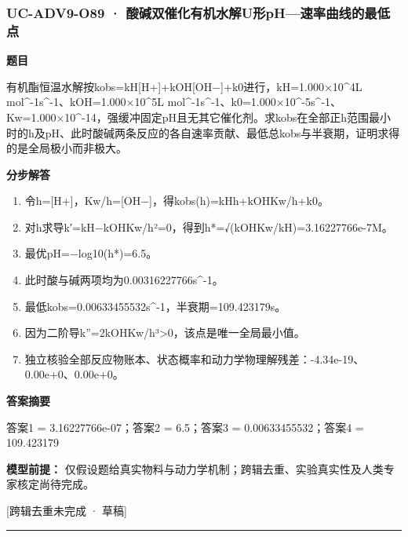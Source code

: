 \documentclass[UTF8,11pt,a4paper]{ctexart}
\begin{document}
\subsubsection*{UC-ADV9-O89 · 酸碱双催化有机水解U形pH—速率曲线的最低点}
\noindent\textbf{题目}\par
有机酯恒温水解按kobs=kH[H+]+kOH[OH−]+k0进行，kH=1.000×10\textasciicircum{}4L mol\textasciicircum{}-1s\textasciicircum{}-1、kOH=1.000×10\textasciicircum{}5L mol\textasciicircum{}-1s\textasciicircum{}-1、k0=1.000×10\textasciicircum{}-5s\textasciicircum{}-1、Kw=1.000×10\textasciicircum{}-14，强缓冲固定pH且无其它催化剂。求kobs在全部正h范围最小时的h及pH、此时酸碱两条反应的各自速率贡献、最低总kobs与半衰期，证明求得的是全局极小而非极大。\par
\medskip\noindent\textbf{分步解答}
\begin{enumerate}
\item 令h=[H+]，Kw/h=[OH−]，得kobs(h)=kHh+kOHKw/h+k0。
\item 对h求导k′=kH−kOHKw/h²=0，得到h*=√(kOHKw/kH)=3.16227766e-7M。
\item 最优pH=−log10(h*)=6.5。
\item 此时酸与碱两项均为0.00316227766s\textasciicircum{}-1。
\item 最低kobs=0.00633455532s\textasciicircum{}-1，半衰期=109.423179s。
\item 因为二阶导k''=2kOHKw/h³>0，该点是唯一全局最小值。
\item 独立核验全部反应物账本、状态概率和动力学物理解残差：-4.34e-19、0.00e+0、0.00e+0。
\end{enumerate}
\noindent\textbf{答案摘要}\par
答案1 = 3.16227766e-07；答案2 = 6.5；答案3 = 0.00633455532；答案4 = 109.423179\par
\noindent\textbf{模型前提：}
仅假设题给真实物料与动力学机制；跨辑去重、实验真实性及人类专家核定尚待完成。\par
\noindent\textcolor{red!65!black}{[跨辑去重未完成 · 草稿]} \par
\medskip\hrule\medskip
{}
\end{document}
